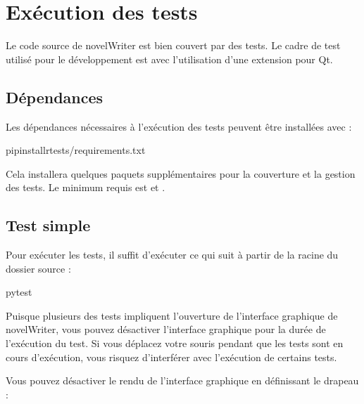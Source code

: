 \documentclass[a4paper,11pt,french]{sphinxmanual}
\begin{document}
\sphinxstepscope


\chapter{Exécution des tests}
\label{\detokenize{tech_tests:running-tests}}\label{\detokenize{tech_tests:a-pytest}}\label{\detokenize{tech_tests::doc}}
\sphinxAtStartPar
Le code source de novelWriter est bien couvert par des tests. Le cadre de test utilisé pour le développement est  avec l’utilisation d’une extension pour Qt.


\section{Dépendances}
\label{\detokenize{tech_tests:dependencies}}
\sphinxAtStartPar
Les dépendances nécessaires à l’exécution des tests peuvent être installées avec :

\begin{sphinxVerbatim}[commandchars=\\\{\}]
pipinstall\PYGZhy{}rtests/requirements.txt
\end{sphinxVerbatim}

\sphinxAtStartPar
Cela installera quelques paquets supplémentaires pour la couverture et la gestion des tests. Le minimum requis est  et .


\section{Test simple}
\label{\detokenize{tech_tests:simple-test-run}}
\sphinxAtStartPar
Pour exécuter les tests, il suffit d’exécuter ce qui suit à partir de la racine du dossier source :

\begin{sphinxVerbatim}[commandchars=\\\{\}]
pytest
\end{sphinxVerbatim}

\sphinxAtStartPar
Puisque plusieurs des tests impliquent l’ouverture de l’interface graphique de novelWriter, vous pouvez désactiver l’interface graphique pour la durée de l’exécution du test. Si vous déplacez votre souris pendant que les tests sont en cours d’exécution, vous risquez d’interférer avec l’exécution de certains tests.

\sphinxAtStartPar
Vous pouvez désactiver le rendu de l’interface graphique en définissant le drapeau  :
\end{document}
